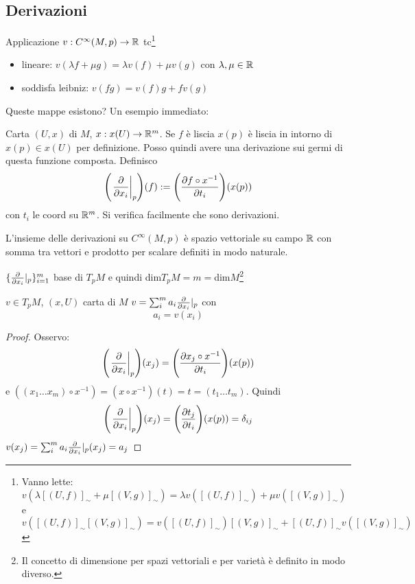 \subsection{Derivazioni}
\begin{definition}[Derivazione]
    Applicazione $v:C^\infty(M,p)\rightarrow\mathbb{R}$ tc\footnote{Vanno
    lette: $v(\lambda [(U,f)]_\sim+\mu [(V,g)]_\sim)=\lambda
    v([(U,f)]_\sim)+\mu v([(V,g)]_\sim)$ e
    $v([(U,f)]_\sim[(V,g)]_\sim)=
    v([(U,f)]_\sim)[(V,g)]_\sim+[(U,f)]_\sim v([(V,g)]_\sim)$}
    \begin{itemize}
        \item lineare: $v(\lambda f+\mu g)=\lambda v(f)+\mu v(g)$
        con $\lambda,\mu\in\mathbb{R}$ 
        \item soddisfa leibniz: $v(fg)=v(f)g+fv(g)$
    \end{itemize} 
\end{definition}
Queste mappe esistono?
Un esempio immediato: 
\begin{ex}
    Carta $(U,x)$ di $M$, $x:x(U)\rightarrow\mathbb{R}^m$. Se $f$ è liscia
    $x(p)$ è liscia in intorno di $x(p)\in x(U)$ per definizione.
    Posso quindi avere una derivazione sui germi di questa funzione
    composta. Definisco
    \begin{equation*}
        \Biggl(\eval{\pdv{x_i}}_p\Biggr)(f):=\Biggl(\pdv{f\circ
        x^{-1}}{t_i}\Biggr)(x(p))
    \end{equation*}
    con $t_i$ le coord su $\mathbb{R}^m$. Si verifica facilmente che sono
    derivazioni.
\end{ex}
L'insieme delle derivazioni su $C^\infty(M,p)$ è spazio vettoriale
su campo $\mathbb{R}$ con somma tra vettori e prodotto per scalare definiti
in modo naturale.
\begin{obs}
    $\{\pdv{x_i}|_p\}_{i=1}^m$ base di $T_pM$ e
    quindi dim$T_pM=m=$dim$M$\footnote{Il concetto di
    dimensione per spazi vettoriali e per varietà è definito in
    modo diverso.}
\end{obs}
\begin{theorem}
    $v\in T_pM$, $(x,U)$ carta di $M$ $v=\sum_i^m a_i\pdv{x_i}|_p$
    con
    \begin{displaymath}
        a_i=v(x_i)
    \end{displaymath}
\end{theorem}
\begin{proof}
    Osservo: 
    \begin{displaymath}
        \Biggl(\eval{\pdv{x_i}}_p\Biggr)(x_j)=\Biggl(\pdv{x_j\circ
        x^{-1}}{t_i}\Biggr)(x(p))
    \end{displaymath}
    e $((x_1\dots x_m)\circ x^{-1})=(x\circ x^{-1})(t)=t=(t_1\dots
    t_m)$. Quindi
    \begin{displaymath}
        \Biggl(\eval{\pdv{x_i}}_p\Biggr)(x_j)=
        \Biggl(\pdv{t_j}{t_i}\Biggr)(x(p))=\delta_{ij}
    \end{displaymath}
    $v(x_j)=\sum_i^m a_i\pdv{x_i}|_p(x_j)=a_j$
\end{proof}


